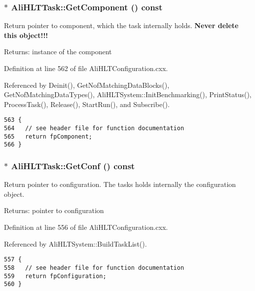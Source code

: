 \subsubsection{ $\ast$ Ali\-HLTTask::Get\-Component () const}\label{classAliHLTTask_a9}


Return pointer to component, which the task internally holds. {\bf Never delete this object!!!} \begin{Desc}
\item[Returns:]instance of the component \end{Desc}


Definition at line 562 of file Ali\-HLTConfiguration.cxx.

Referenced by Deinit(), Get\-Nof\-Matching\-Data\-Blocks(), Get\-Nof\-Matching\-Data\-Types(), Ali\-HLTSystem::Init\-Benchmarking(), Print\-Status(), Process\-Task(), Release(), Start\-Run(), and Subscribe().

\footnotesize\begin{verbatim}563 {
564   // see header file for function documentation
565   return fpComponent;
566 }
\end{verbatim}\normalsize 


\subsubsection{ $\ast$ Ali\-HLTTask::Get\-Conf () const}\label{classAliHLTTask_a8}


Return pointer to configuration. The tasks holds internally the configuration object. \begin{Desc}
\item[Returns:]pointer to configuration \end{Desc}


Definition at line 556 of file Ali\-HLTConfiguration.cxx.

Referenced by Ali\-HLTSystem::Build\-Task\-List().

\footnotesize\begin{verbatim}557 {
558   // see header file for function documentation
559   return fpConfiguration;
560 }
\end{verbatim}\normalsize 


